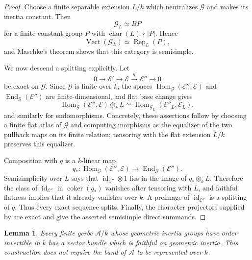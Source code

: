 \documentclass[11pt,reqno]{amsart}
\numberwithin{equation}{section}
\theoremstyle{plain}
\newtheorem{lemm}[prop]{Lemma}
\theoremstyle{definition}
\def\cA{{\mathcal A}}
\def\cG{{\mathcal G}}
\def\cE{{\mathcal E}}
\def\Hom{{\operatorname{Hom}}}
\def\ra{{\rightarrow}}
\def\Vect{{\operatorname{Vect}}}
\begin{document}
\begin{proof}
Choose a finite separable extension $L/k$ which neutralizes $\cG$ and
makes its inertia constant.  Then
\[
\cG_L\simeq BP
\]
for a finite constant group $P$ with $\operatorname{char}(L)\nmid |P|$.
Hence
\[
\Vect(\cG_L)\simeq\operatorname{Rep}_L(P),
\]
and Maschke's theorem shows that this category is semisimple.

We now descend a splitting explicitly. Let
\[
0\ra\cE'\ra\cE
\xrightarrow{q}\cE''\ra0
\]
be exact on $\cG$.  Since $\cG$ is finite over $k$, the spaces
$\Hom_{\cG}(\cE'',\cE)$ and
$\operatorname{End}_{\cG}(\cE'')$ are finite-dimensional, and flat base change gives
\[
\Hom_{\cG}(\cE'',\cE)\otimes_kL
\simeq
\Hom_{\cG_L}(\cE''_L,\cE_L),
\]
and similarly for endomorphisms. Concretely, these assertions follow by
choosing a finite flat atlas of $\cG$ and computing morphisms as the equalizer of
the two pullback maps on its finite relation; tensoring with the flat
extension $L/k$ preserves this equalizer.

Composition with $q$ is a $k$-linear map
\[
q_*:\Hom_{\cG}(\cE'',\cE)\ra\operatorname{End}_{\cG}(\cE'').
\]
Semisimplicity over $L$ says that
$\operatorname{id}_{\cE''}\otimes1$ lies in the image of $q_*\otimes_kL$.
Therefore the class of $\operatorname{id}_{\cE''}$ in $\operatorname{coker}(q_*)$
vanishes after tensoring with $L$, and faithful flatness implies that
it already vanishes over $k$.  A preimage of $\operatorname{id}_{\cE''}$ is a
splitting of $q$.  Thus every exact sequence splits.  Finally, the
character projectors supplied by
\cite[Expos\'e~I, Proposition~4.7.3]{SGA3I} are exact and give the
asserted semisimple direct summands.
\end{proof}

\begin{lemm}\label{lem:intrinsic-regular-bundle}
Every finite gerbe $\cA/k$ whose geometric inertia groups have order
invertible in $k$ has a vector bundle which is faithful on geometric
inertia.  This construction does not require the band of $\cA$ to be
represented over $k$.
\end{lemm}
\end{document}
